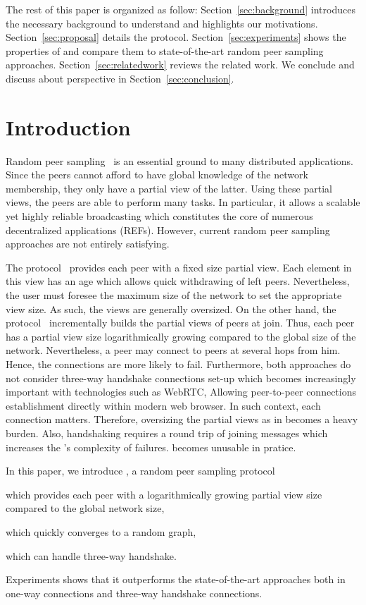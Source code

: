 The rest of this paper is organized as follow: Section~\ref{sec:background}
introduces the necessary background to understand \SCAMPLON{} and highlights
our motivations. Section~\ref{sec:proposal} details the \SCAMPLON{} protocol.
Section~\ref{sec:experiments} shows the properties of \SCAMPLON{} and compare
them to state-of-the-art random peer sampling
approaches. Section~\ref{sec:relatedwork} reviews the related work. We conclude
and discuss about perspective in Section~\ref{sec:conclusion}.

\section{Introduction}
Random peer sampling~\cite{jelasity2004peer} is an essential ground to many
distributed applications. Since the peers cannot afford to have global
knowledge of the network membership, they only have a partial view of the
latter. Using these partial views, the peers are able to perform many tasks. In
particular, it allows a scalable yet highly reliable broadcasting which
constitutes the core of numerous decentralized applications (REFs). However,
current random peer sampling approaches are not entirely satisfying.

The \CYCLON{} protocol~\cite{voulgaris2005cyclon} provides each peer with a
fixed size partial view.  Each element in this view has an age which allows
quick withdrawing of left peers. Nevertheless, the user must foresee the
maximum size of the network to set the appropriate view size. As such, the
views are generally oversized. On the other hand, the \SCAMP{}
protocol~\cite{ganesh2001scamp,ganesh2003peer} incrementally builds the partial
views of peers at join. Thus, each peer has a partial view size logarithmically
growing compared to the global size of the network. Nevertheless, a peer may
connect to peers at several hops from him. Hence, the connections are more
likely to fail.  Furthermore, both approaches do not consider three-way
handshake connections set-up which becomes increasingly important with
technologies such as WebRTC, Allowing peer-to-peer connections establishment
directly within modern web browser. In such context, each connection
matters. Therefore, oversizing the partial views as in \CYCLON{} becomes a
heavy burden. Also, handshaking requires a round trip of joining messages which
increases the \SCAMP{}'s complexity of failures. \SCAMP{} becomes unusable in
pratice.

In this paper, we introduce \SCAMPLON{}, a random peer sampling protocol
\begin{inparaenum}[(i)]
\item which provides each peer with a logarithmically growing partial view size
  compared to the global network size,
\item which quickly converges to a random graph,
\item which can handle three-way handshake.
\end{inparaenum}
Experiments shows that it outperforms the state-of-the-art approaches both in
one-way connections and three-way handshake connections.

